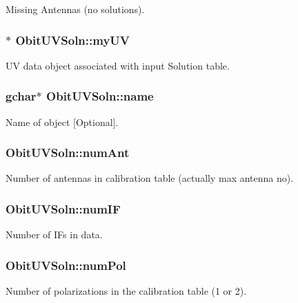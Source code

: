 Missing Antennas (no solutions). 

\subsubsection{$\ast$ {\bf Obit\-UVSoln::my\-UV}}\label{structObitUVSoln_o6}


UV data object associated with input Solution table. 

\subsubsection{\setlength{\rightskip}{0pt plus 5cm}gchar$\ast$ {\bf Obit\-UVSoln::name}}\label{structObitUVSoln_o3}


Name of object [Optional]. 

\subsubsection{ {\bf Obit\-UVSoln::num\-Ant}}\label{structObitUVSoln_o14}


Number of antennas in calibration table (actually max antenna no). 

\subsubsection{ {\bf Obit\-UVSoln::num\-IF}}\label{structObitUVSoln_o16}


Number of IFs in data. 

\subsubsection{ {\bf Obit\-UVSoln::num\-Pol}}\label{structObitUVSoln_o19}


Number of polarizations in the calibration table (1 or 2). 


